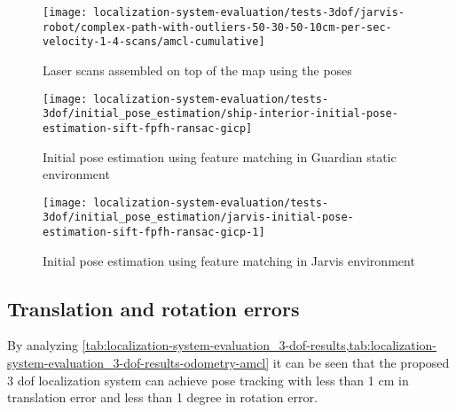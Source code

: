 \begin{figure}[H]
	\centering
	\texttt{[image: localization-system-evaluation/tests-3dof/jarvis-robot/complex-path-with-outliers-50-30-50-10cm-per-sec-velocity-1-4-scans/amcl-cumulative]}
	\caption{Laser scans assembled on top of the map using the  poses}
	\label{fig:localization-system-evaluation_complex-path-with-outliers-50-30-50-10cm-per-sec-velocity-1-4-scans-amcl-cumulative}
\end{figure}


\begin{figure}[H]
	\centering
	\texttt{[image: localization-system-evaluation/tests-3dof/initial\_pose\_estimation/ship-interior-initial-pose-estimation-sift-fpfh-ransac-gicp]}
	\caption{Initial pose estimation using feature matching in Guardian static environment}
	\label{fig:localization-system-evaluation_ship-interior-initial-pose-estimation-sift-fpfh-ransac-gicp}
\end{figure}

\begin{figure}[H]
	\centering
	\texttt{[image: localization-system-evaluation/tests-3dof/initial\_pose\_estimation/jarvis-initial-pose-estimation-sift-fpfh-ransac-gicp-1]}
	\caption{Initial pose estimation using feature matching in Jarvis environment}
	\label{fig:localization-system-evaluation_jarvis-initial-pose-estimation-sift-fpfh-ransac-gicp-1}
\end{figure}





\subsection{Translation and rotation errors}

By analyzing \cref{tab:localization-system-evaluation_3-dof-results,tab:localization-system-evaluation_3-dof-results-odometry-amcl} it can be seen that the proposed 3 \gls{dof} localization system can achieve pose tracking with less than 1 cm in translation error and less than 1 degree in rotation error.


